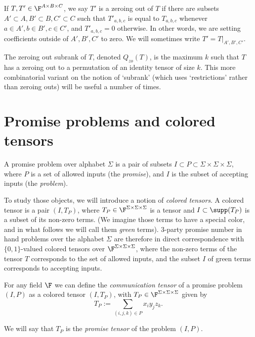 If $T,T' \in \F^{A \times B \times C}$, we say $T'$ is a zeroing out of $T$ if there are subsets $A' \subset A, B' \subset B, C' \subset C$ such that $T'_{a,b,c}$ is equal to $T_{a,b,c}$ whenever $a \in A', b \in B', c \in C'$, and $T'_{a,b,c} = 0$ otherwise. In other words, we are setting coefficients outside of $A',B',C'$ to zero. We will sometimes write $T' = T|_{A',B',C'}$.

The zeroing out subrank of $T$, denoted $Q_{zo}(T)$, is the maximum $k$ such that $T$ has a zeroing out to a permutation of an identity tensor of size $k$. This more combinatorial variant on the notion of `subrank' (which uses `restrictions' rather than zeroing outs) will be useful a number of times.

\section{Promise problems and colored tensors}


\begin{definition}
A promise problem over alphabet $\Sigma$ is a pair of subsets $I \subset P \subset \Sigma\times\Sigma\times\Sigma$, where $P$ is a set of allowed inputs (the \emph{promise}), and $I$ is the subset of accepting inputs (the \emph{problem}).
\end{definition}

To study those objects, we will introduce a notion of \emph{colored tensors}. A colored tensor is a pair $(I, T_P)$, where $T_P \in \F^{\Sigma \times \Sigma \times \Sigma}$ is a tensor and $I \subset \supp(T_P)$ is a subset of its non-zero terms. (We imagine those terms to have a special color, and in what follows we will call them \emph{green} terms). 3-party promise number in hand problems over the alphabet $\Sigma$ are therefore in direct correspondence with $\{0, 1\}$-valued colored tensors over $\F^{\Sigma \times \Sigma \times \Sigma}$, where the non-zero terms of the tensor $T$ corresponds to the set of allowed inputs, and the subset $I$ of green terms corresponds to accepting inputs.

\begin{definition}
For any field $\F$ we can define the \emph{communication tensor} of a promise problem $(I, P)$ as a colored tensor $(I, T_P)$, with $T_P \in \F^{\Sigma \times \Sigma \times \Sigma}$ given by
\begin{equation*}
    T_P := \sum_{(i,j,k) \in P} x_i y_j z_k.
\end{equation*}

We will say that $T_P$ is the \emph{promise tensor} of the problem $(I, P)$. 
\end{definition}

